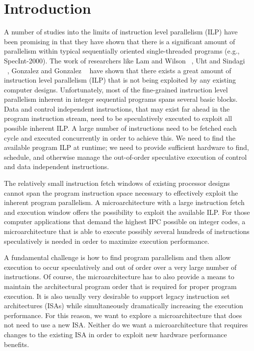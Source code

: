 \documentclass[10pt,dvips]{article}
\begin{document}
\section{Introduction}
%
A number of studies into the limits of instruction level 
parallelism (ILP) have
been promising in that they have shown that there is 
a significant amount of parallelism within
typical sequentially oriented single-threaded programs
(e.g., SpecInt-2000).  
The work of researchers like
Lam and Wilson ~\cite{Lam92},
Uht and Sindagi ~\cite{Uht95},
Gonzalez and Gonzalez ~\cite{Gon97}
have shown that there exists a great amount of instruction level
parallelism (ILP) that is not being exploited by any existing
computer designs.
Unfortunately, most of the fine-grained instruction level
parallelism inherent in integer sequential programs
spans several basic blocks.  
Data and control independent instructions, that may exist
far ahead in the program instruction stream, need to be
speculatively executed to exploit all possible inherent
ILP.
A large number of instructions need to be fetched
each cycle and executed concurrently in order to achieve this.
We need to find the available program ILP at runtime; we need to 
provide sufficient hardware to find, schedule,
and otherwise manage the out-of-order speculative execution of
control and data independent instructions.

The relatively small
instruction fetch windows of existing processor designs cannot span
the program instruction space necessary to effectively exploit the
inherent program parallelism.  
A microarchitecture with a large instruction fetch and
execution window offers the possibility to exploit the available ILP.
For those computer applications that demand the
highest IPC possible on integer codes, a microarchitecture
that is able to execute possibly
several hundreds of instructions speculatively is needed in order to 
maximize execution performance.  

A fundamental challenge 
is how to find program parallelism and then allow execution to occur
speculatively and out of order over a very large number of instructions.
Of course, the microarchitecture has to also provide a means
to maintain the architectural program order that
is required for proper program execution.
It is also usually very desirable to support legacy instruction
set architectures (ISAs) while simultaneously dramatically
increasing the execution performance.
For this reason, we want to explore a
microarchitecture that does not need to use a new ISA.  
Neither do we
want a microarchitecture that requires
changes to the existing ISA in order to
exploit new hardware performance benefits.
\end{document}
